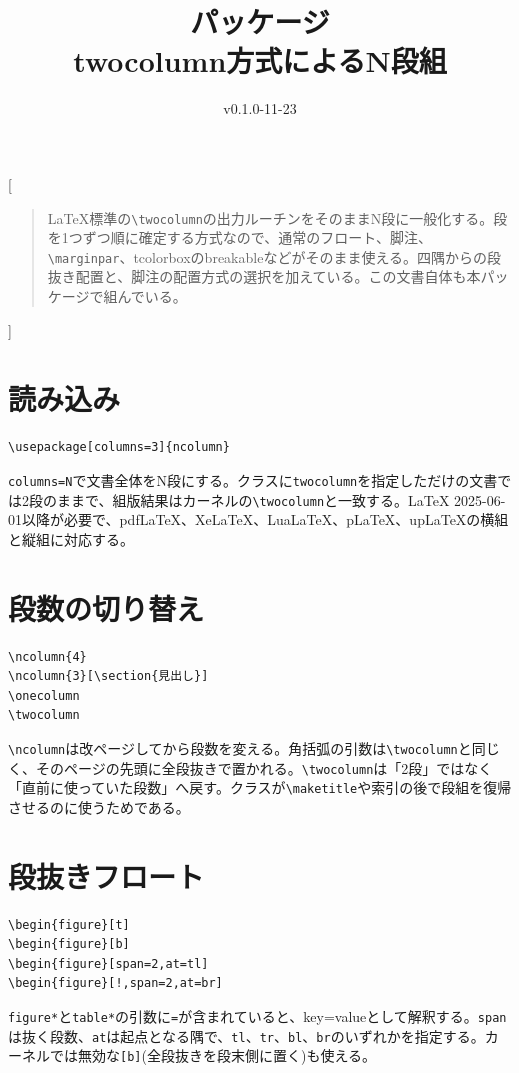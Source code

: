 \documentclass[a4paper,10pt]{ltjsarticle}
\title{\pkg{ncolumn}パッケージ\\\large twocolumn方式によるN段組}
\author{}
\date{v0.1.0\quad 2026-11-23}
\newcommand\pkg[1]{\textsf{#1}}
\newcommand\code[1]{\texttt{#1}}
\newcommand\cs[1]{\texttt{\textbackslash #1}}
\begin{document}
[{\maketitle
\begin{quote}\small
LaTeX標準の\cs{twocolumn}の出力ルーチンをそのままN段に一般化する。段を1つずつ順に確定する方式なので、通常のフロート、脚注、\cs{marginpar}、\pkg{tcolorbox}のbreakableなどがそのまま使える。四隅からの段抜き配置と、脚注の配置方式の選択を加えている。この文書自体も本パッケージで組んでいる。
\end{quote}\bigskip}]

\section{読み込み}
\begin{verbatim}
\usepackage[columns=3]{ncolumn}
\end{verbatim}
\code{columns=N}で文書全体をN段にする。クラスに\code{twocolumn}を指定しただけの文書では2段のままで、組版結果はカーネルの\cs{twocolumn}と一致する。LaTeX 2025-06-01以降が必要で、pdf\LaTeX{}、Xe\LaTeX{}、Lua\LaTeX{}、p\LaTeX{}、up\LaTeX{}の横組と縦組に対応する。

\section{段数の切り替え}
\begin{verbatim}
\ncolumn{4}
\ncolumn{3}[\section{見出し}]
\onecolumn
\twocolumn
\end{verbatim}
\cs{ncolumn}は改ページしてから段数を変える。角括弧の引数は\cs{twocolumn}と同じく、そのページの先頭に全段抜きで置かれる。\cs{twocolumn}は「2段」ではなく「直前に使っていた段数」へ戻す。クラスが\cs{maketitle}や索引の後で段組を復帰させるのに使うためである。

\section{段抜きフロート}
\begin{verbatim}
\begin{figure}[t]
\begin{figure}[b]
\begin{figure}[span=2,at=tl]
\begin{figure}[!,span=2,at=br]
\end{verbatim}
\code{figure*}と\code{table*}の引数に\code{=}が含まれていると、key=valueとして解釈する。\code{span}は抜く段数、\code{at}は起点となる隅で、\code{tl}、\code{tr}、\code{bl}、\code{br}のいずれかを指定する。カーネルでは無効な\code{[b]}(全段抜きを段末側に置く)も使える。
\end{document}
